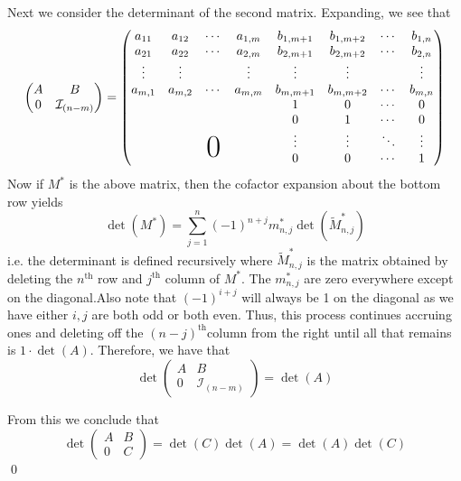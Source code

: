 \documentclass[a4paper, 11pt]{article}
\newenvironment{solution}{%
	\begin{list}{}{%
			\setlength{\topsep}{0pt}%
			\setlength{\leftmargin}{1.5cm}%
			\setlength{\rightmargin}{1.5cm}%
			\setlength{\listparindent}{\parindent}%
			\setlength{\itemindent}{\parindent}%
			\setlength{\parsep}{\parskip}%
		}%
		\item[]}{\end{list}}
\begin{document}
\begin{solution}
  \noindent Next we consider the determinant of the second matrix. Expanding, we see that
  \begin{equation*}
    \begin{pmatrix} A & B \\ 0 & \mathcal{I}_{(n-m)} \end{pmatrix} = \begin{pmatrix}
      a_{11} & a_{12} & \cdots & a_{1,m} & b_{1,m+1} & b_{1, m+2} & \cdots & b_{1, n} \\
      a_{21} & a_{22} & \cdots & a_{2,m} & b_{2,m+1} & b_{2,m+2} & \cdots & b_{2, n}\\
      \vdots & \vdots &  & \vdots & \vdots & \vdots & & \vdots\\
      a_{m,1} & a_{m,2} & \cdots & a_{m,m} & b_{m,m+1} & b_{m,m+2} &\cdots & b_{m,n} \\
      & & & & 1 & 0  & \cdots & 0  \\ 
      & & & & 0 & 1  & \cdots & 0  \\
      & & \makebox(0,0){\text{\Huge{0}}}& & \vdots & \vdots & \ddots & \vdots  \\
      & & & & 0 & 0  & \cdots & 1 \\
    \end{pmatrix}
  \end{equation*}
  Now if $M^*$ is the above matrix, then the cofactor expansion about the bottom row yields
  \begin{equation*}
    \det(M^*) = \sum\limits_{j=1}^n (-1)^{n+j}m_{n, j}^*\det(\tilde{M}_{n, j}^*) 
  \end{equation*}
  i.e. the determinant is defined recursively where $\tilde{M}_{n,j}^*$ is the matrix obtained by deleting the $n^\text{th}$ row and $j^\text{th}$ column of $M^*$. The $m_{n,j}^*$ are zero everywhere except on the diagonal.Also note that $(-1)^{i+j}$ will always be 1 on the diagonal as we have either $i, j$ are both odd or both even. Thus, this process continues accruing ones and deleting off the $(n-j)^\text{th}$column from the right until all that remains is $1\cdot \det(A)$. Therefore, we have that
  \begin{equation*}
    \det\begin{pmatrix} A & B \\ 0 & \mathcal{I}_{(n-m)}\end{pmatrix} = \det(A)
  \end{equation*}

  \noindent From this we conclude that
  \begin{equation*}
    \det\begin{pmatrix} A & B \\ 0 & C \end{pmatrix} = \det(C)\det(A) = \det(A)\det(C) 
  \end{equation*}
  \qed
  \end{solution}
\end{document}
